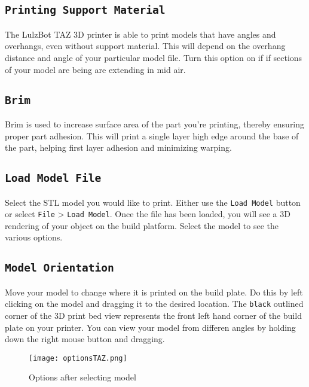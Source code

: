 \subsection{\texttt{Printing Support Material}}
The LulzBot TAZ 3D printer is able to print models that have angles and overhangs, even without support material. This will depend on the overhang distance and angle of your particular model file. Turn this option on if if sections of your model are being are extending in mid air.

\subsection{\texttt{Brim}}
Brim is used to increase surface area of the part you're printing, thereby ensuring proper part adhesion. This will print a single layer high edge around the base of the part, helping first layer adhesion and minimizing warping.

\subsection{\texttt{Load Model File}}
Select the STL model you would like to print. Either use the \texttt{Load Model} button or select \texttt{File} > \texttt{Load Model}. Once the file has been loaded, you will see a 3D rendering of your object on the build platform. Select the model to see the various options. 

\subsection{\texttt{Model Orientation}}
Move your model to change where it is printed on the build plate. Do this by left clicking on the model and dragging it to the desired location. The \texttt{black} outlined corner of the 3D print bed view represents the front left hand corner of the build plate on your printer. You can view your model from differen angles by holding down the right mouse button and dragging. %
\begin{figure}[H]
\centering
\texttt{[image: optionsTAZ.png]}
\caption{Options after selecting model}
\label{fig:Orientation}
\end{figure}

